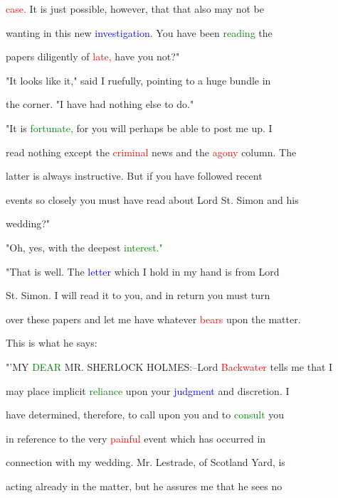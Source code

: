  \textcolor{red}{case.} It is just possible, however, that that also may not be

 wanting in this new \textcolor{blue}{investigation.} You have been \textcolor{green}{reading} the

 papers diligently of \textcolor{red}{late,} have you not?"



 "It looks like it," said I ruefully, pointing to a huge bundle in

 the corner. "I have had nothing else to do."



 "It is \textcolor{green}{fortunate,} for you will perhaps be able to post me up. I

 read nothing except the \textcolor{red}{criminal} news and the \textcolor{red}{agony} column. The

 latter is always instructive. But if you have followed recent

 events so closely you must have read about \textcolor{BurntOrange}{Lord} St. Simon and his

 wedding?"



 "Oh, yes, with the deepest \textcolor{green}{interest."}



 "That is well. The \textcolor{blue}{letter} which I hold in my hand is from \textcolor{BurntOrange}{Lord}

 St. Simon. I will read it to you, and in return you must turn

 over these papers and let me have whatever \textcolor{red}{bears} upon the matter.

 This is what he says:



 "'MY \textcolor{green}{DEAR} MR. SHERLOCK HOLMES:--Lord \textcolor{red}{Backwater} tells me that I

 may place implicit \textcolor{green}{reliance} upon your \textcolor{blue}{judgment} and \textcolor{BurntOrange}{discretion.} I

 have determined, therefore, to call upon you and to \textcolor{green}{consult} you

 in reference to the very \textcolor{red}{painful} event which has occurred in

 connection with my wedding. Mr. Lestrade, of Scotland Yard, is

 acting already in the matter, but he assures me that he sees no

